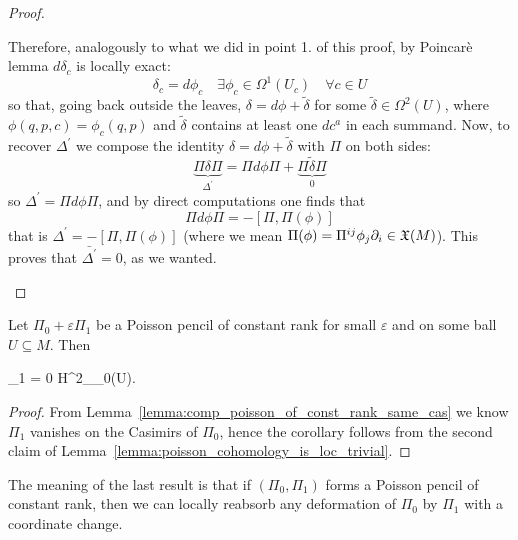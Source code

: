 \documentclass[main.tex]{subfiles}
\begin{document}
\begin{proof}
\begin{enumerate}
		Therefore, analogously to what we did in point 1. of this proof, by Poincarè lemma $d\delta_c$ is locally
		exact:
		\begin{equation}
		 \delta_c=d\phi_c	\quad 	\exists\phi_c\in\Omega^1(U_c)\quad\forall c\in U
		\end{equation}
		so that, going back outside the leaves, $\delta=d\phi+\tilde{\delta}$ for some $\tilde{\delta}\in\Omega^2(U)$,
		where $\phi(q,p,c)=\phi_c(q,p)$ and $\tilde{\delta}$ contains at least one $dc^a$ in each summand.
		Now, to recover $\Delta^\prime$ we compose the identity $\delta=d\phi+\tilde{\delta}$ with $\Pi$ on both
		sides:
		\begin{equation}
		 \underbrace{\Pi\delta\Pi}_{\Delta^\prime}=\Pi d\phi\Pi+\underbrace{\Pi\tilde{\delta}\Pi}_{0}
		\end{equation}
		so $\Delta^\prime=\Pi d\phi\Pi$, and by direct computations one finds that
		\begin{equation}
		 \Pi d\phi \Pi=-[\Pi,\Pi(\phi)]
		\end{equation}
		that is $\Delta^\prime=-[\Pi,\Pi(\phi)]$ (where we mean $\Pi(\phi)=\Pi^{ij}\phi_j\partial_i\in\mathfrak{X}(M)$).
		This proves that $\bar{\Delta^\prime}=0$, as we wanted.
	\end{enumerate}
\end{proof}

\begin{corollary}
	Let $\Pi_0 + \varepsilon \Pi_1$ be a Poisson pencil of constant rank for small $\varepsilon$ and on some ball $U \subseteq M$. Then
	\begin{eqalign}
		\overline \Pi_1 = 0 \in H^2_{\Pi_0}(U).
	\end{eqalign}
\end{corollary}
\begin{proof}
	From Lemma~\ref{lemma:comp_poisson_of_const_rank_same_cas} we know $\Pi_1$ vanishes on the Casimirs of $\Pi_0$, hence the corollary follows from the second claim of Lemma~\ref{lemma:poisson_cohomology_is_loc_trivial}.
\end{proof}

The meaning of the last result is that if $(\Pi_0, \Pi_1)$ forms a Poisson pencil of constant rank, then we can locally reabsorb any deformation of $\Pi_0$ by $\Pi_1$ with a coordinate change.
\end{document}
